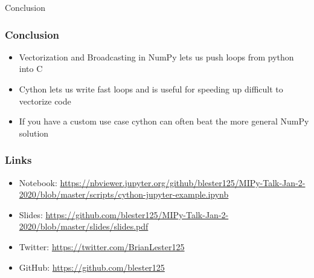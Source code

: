 \documentclass{beamer}
\theoremstyle{case}
\begin{document}
\begin{section}{Conclusion}

\begin{frame}
    \frametitle{Conclusion}
    \begin{itemize}
        \item Vectorization and Broadcasting in NumPy lets us push loops from python into C
        \item Cython lets us write fast loops and is useful for speeding up difficult to vectorize code
        \item If you have a custom use case cython can often beat the more general NumPy solution
    \end{itemize}
\end{frame}

\begin{frame}
    \frametitle{Links}
    \begin{itemize}
        \item Notebook: \href{https://nbviewer.jupyter.org/github/blester125/MIPy-Talk-Jan-2-2020/blob/master/scripts/cython-jupyter-example.ipynb}{https://nbviewer.jupyter.org/github/blester125/MIPy-Talk-Jan-2-2020/blob/master/scripts/cython-jupyter-example.ipynb}
        \item Slides: \href{https://github.com/blester125/MIPy-Talk-Jan-2-2020/blob/master/slides/slides.pdf}{https://github.com/blester125/MIPy-Talk-Jan-2-2020/blob/master/slides/slides.pdf}
        \item Twitter: \href{https://twitter.com/BrianLester125}{https://twitter.com/BrianLester125}
        \item GitHub: \href{https://github.com/blester125}{https://github.com/blester125}
    \end{itemize}
\end{frame}

\end{section} %
\end{document}
